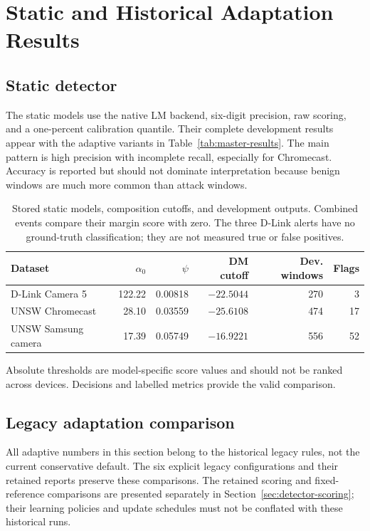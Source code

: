 \section{Static and Historical Adaptation Results}

\subsection{Static detector}

The static models use the native LM backend, six-digit precision, raw scoring,
and a one-percent calibration quantile. Their complete development results appear
with the adaptive variants in Table~\ref{tab:master-results}. The main pattern is
high precision with incomplete recall, especially for Chromecast. Accuracy is
reported but should not dominate interpretation because benign windows are much
more common than attack windows.

\begin{table}[H]
\centering
\small
\begin{tabular}{lrrrrr}
\toprule
\textbf{Dataset} & \textbf{$\alpha_0$} & \textbf{$\psi$} &
\textbf{DM cutoff} & \textbf{Dev. windows} & \textbf{Flags} \\
\midrule
D-Link Camera 5 & 122.22 & 0.00818 & $-22.5044$ & 270 & 3 \\
UNSW Chromecast & 28.10 & 0.03559 & $-25.6108$ & 474 & 17 \\
UNSW Samsung camera & 17.39 & 0.05749 & $-16.9221$ & 556 & 52 \\
\bottomrule
\end{tabular}
\caption{Stored static models, composition cutoffs, and development outputs.
Combined events compare their margin score with zero. The three D-Link alerts have no ground-truth classification; they are not
measured true or false positives.}
\label{tab:static-model-summary}
\end{table}

Absolute thresholds are model-specific score values and should not be ranked
across devices. Decisions and labelled metrics provide the valid comparison.

\subsection{Legacy adaptation comparison}

All adaptive numbers in this section belong to the historical legacy rules,
not the current conservative default. The six explicit legacy configurations
and their retained reports preserve these comparisons.
The retained scoring and fixed-reference comparisons are presented separately
in Section~\ref{sec:detector-scoring}; their learning policies and update
schedules must not be conflated with these historical runs.


